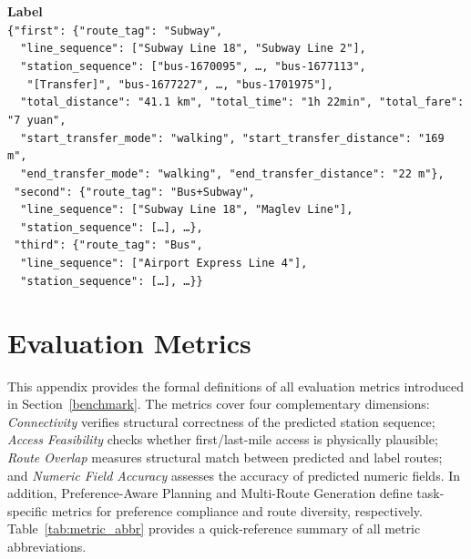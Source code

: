 \documentclass{llmxive}
\begin{document}
\begin{tcolorbox}[colback=gray!3, colframe=black!40, boxrule=0.4pt, arc=2pt, left=6pt, right=6pt, top=4pt, bottom=4pt, fontupper=\small, fontlower=\small, breakable, title={\small\textbf{Prompt \& Label}}]
\vspace{6pt}
\textbf{Label} \\[4pt]
\texttt{\{"first": \{"route\_tag": "Subway",} \\
\texttt{~~"line\_sequence": ["Subway Line 18", "Subway Line 2"],} \\
\texttt{~~"station\_sequence": ["bus-1670095", \ldots, "bus-1677113",} \\
\texttt{~~~"[Transfer]", "bus-1677227", \ldots, "bus-1701975"],} \\
\texttt{~~"total\_distance": "41.1 km", "total\_time": "1h 22min", "total\_fare": "7 yuan",} \\
\texttt{~~"start\_transfer\_mode": "walking", "start\_transfer\_distance": "169 m",} \\
\texttt{~~"end\_transfer\_mode": "walking", "end\_transfer\_distance": "22 m"\},} \\[3pt]
\texttt{~"second": \{"route\_tag": "Bus+Subway",} \\
\texttt{~~"line\_sequence": ["Subway Line 18", "Maglev Line"],} \\
\texttt{~~"station\_sequence": [\ldots], \ldots\},} \\[3pt]
\texttt{~"third": \{"route\_tag": "Bus",} \\
\texttt{~~"line\_sequence": ["Airport Express Line 4"],} \\
\texttt{~~"station\_sequence": [\ldots], \ldots\}\}}
\end{tcolorbox}

\section{Evaluation Metrics}
\label{app:metrics}

This appendix provides the formal definitions of all evaluation metrics introduced in Section~\ref{benchmark}. The metrics cover four complementary dimensions: \textit{Connectivity} verifies structural correctness of the predicted station sequence; \textit{Access Feasibility} checks whether first/last-mile access is physically plausible; \textit{Route Overlap} measures structural match between predicted and label routes; and \textit{Numeric Field Accuracy} assesses the accuracy of predicted numeric fields. In addition, Preference-Aware Planning and Multi-Route Generation define task-specific metrics for preference compliance and route diversity, respectively. Table~\ref{tab:metric_abbr} provides a quick-reference summary of all metric abbreviations.
\end{document}

